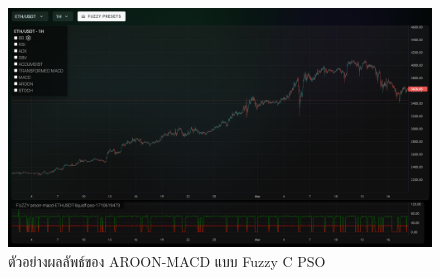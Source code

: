 \begin{figure}[ht]
    \centering
    \includegraphics[width=\textwidth]{images/aroon-macd/example.png}
    \caption{ตัวอย่างผลลัพธ์ของ AROON-MACD แบบ Fuzzy C PSO}
    \label{fig:aroon-macd-example}
\end{figure}

